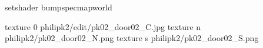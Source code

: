 setshader bumpspecmapworld

texture 0 philipk2/edit/pk02_door02_C.jpg
texture n philipk2/pk02_door02_N.png
texture s philipk2/pk02_door02_S.png


